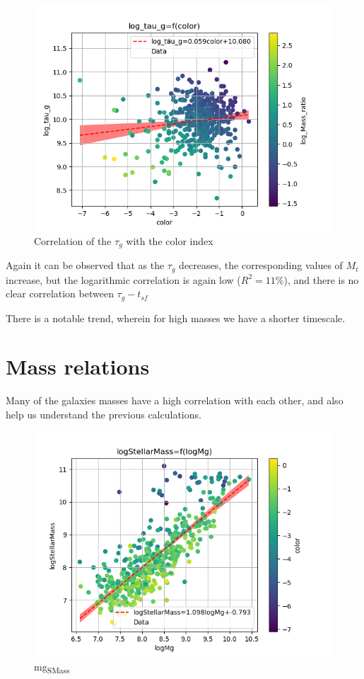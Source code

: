 \documentclass[a4paper,twocolumn]{article}
\begin{document}
\begin{figure}[!htpb]
\centering
\includegraphics[width=.9\linewidth]{./figs/color-log_tau_g-color_log_Mass_ratio.png}
\caption{\label{fig:Correlation of the $\tau_g$ with the color index}Correlation of the \(\tau_g\) with the color index}
\end{figure}

Again it can be observed that as the \(\tau_g\) decreases, the corresponding values of \(M_t\) increase, but the logarithmic correlation is again low (\(R^2 = 11\%\)), and there is no clear correlation between \(\tau_g-t_{sf}\)

There is a notable trend, wherein for high masses we have a shorter timescale.

\section{Mass relations}
\label{sec:org4c8a4bc}

Many of the galaxies masses have a high correlation with each other, and also help us understand the previous calculations.

\begin{figure}[!htpb]
\centering
\includegraphics[width=.9\linewidth]{./figs/logMg-logStellarMass-color_color.png}
\caption{\label{fig:mg_SMass}mg\textsubscript{SMass}}
\end{figure}
\end{document}
